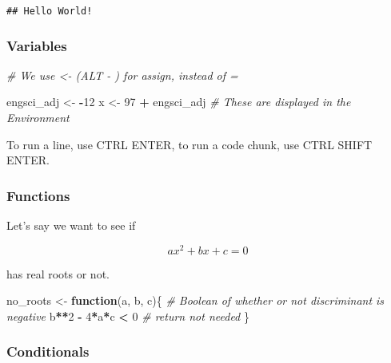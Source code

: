 \documentclass[
]{article}
\newenvironment{Shaded}{\begin{snugshade}}{\end{snugshade}}
\newcommand{\CommentTok}[1]{\textcolor[rgb]{0.56,0.35,0.01}{\textit{#1}}}
\newcommand{\ControlFlowTok}[1]{\textcolor[rgb]{0.13,0.29,0.53}{\textbf{#1}}}
\newcommand{\DecValTok}[1]{\textcolor[rgb]{0.00,0.00,0.81}{#1}}
\newcommand{\NormalTok}[1]{#1}
\newcommand{\OtherTok}[1]{\textcolor[rgb]{0.56,0.35,0.01}{#1}}
\newcommand{\SpecialCharTok}[1]{\textcolor[rgb]{0.81,0.36,0.00}{\textbf{#1}}}
\begin{document}
\begin{verbatim}
## Hello World!
\end{verbatim}

\hypertarget{variables}{%
\subsubsection{Variables}\label{variables}}

\begin{Shaded}
\begin{Highlighting}[]
\CommentTok{\# We use \textless{}{-} (ALT {-} ) for assign, instead of =}

\NormalTok{engsci\_adj }\OtherTok{\textless{}{-}} \SpecialCharTok{{-}}\DecValTok{12}
\NormalTok{x }\OtherTok{\textless{}{-}} \DecValTok{97} \SpecialCharTok{+}\NormalTok{ engsci\_adj}
\CommentTok{\# These are displayed in the Environment}
\end{Highlighting}
\end{Shaded}

To run a line, use CTRL ENTER, to run a code chunk, use CTRL SHIFT
ENTER.

\hypertarget{functions}{%
\subsubsection{Functions}\label{functions}}

Let's say we want to see if

\[ax^2+bx+c=0\]

has real roots or not.

\begin{Shaded}
\begin{Highlighting}[]
\NormalTok{no\_roots }\OtherTok{\textless{}{-}} \ControlFlowTok{function}\NormalTok{(a, b, c)\{}
  \CommentTok{\# Boolean of whether or not discriminant is negative}
\NormalTok{  b}\SpecialCharTok{**}\DecValTok{2} \SpecialCharTok{{-}} \DecValTok{4}\SpecialCharTok{*}\NormalTok{a}\SpecialCharTok{*}\NormalTok{c }\SpecialCharTok{\textless{}} \DecValTok{0}
  \CommentTok{\# return not needed}
\NormalTok{\}}
\end{Highlighting}
\end{Shaded}

\hypertarget{conditionals}{%
\subsubsection{Conditionals}\label{conditionals}}
\end{document}
